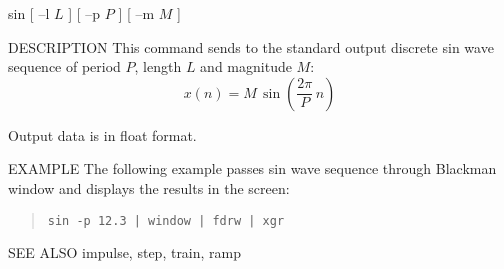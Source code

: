 
\begin{synopsis}
\item[sin] [ --l $L$ ] [ --p $P$ ] [ --m $M$ ]
\end{synopsis}

\begin{qsection}{DESCRIPTION}
This command sends to the standard output
discrete sin wave sequence of
period $P$, length $L$ and magnitude $M$:
\begin{displaymath}
  x(n) = M\,\sin (\frac{2\pi}{P}\,n)
\end{displaymath}
\par
Output data is in float format.
\end{qsection}

\begin{options}
\end{options}

\begin{qsection}{EXAMPLE}
The following example passes sin wave sequence through
Blackman window and displays the results in the screen:
\begin{quote}
\verb!sin -p 12.3 | window | fdrw | xgr!
\end{quote}
\end{qsection}

\begin{qsection}{SEE ALSO}
  impulse, step, train, ramp
\end{qsection}
